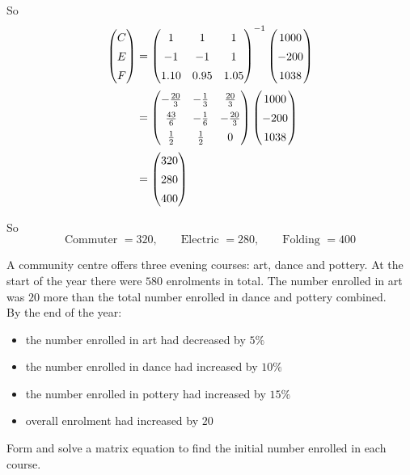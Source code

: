 \documentclass[leqno]{article}
\begin{document}
\begin{enumerate}[
  label=\textbf{\arabic*.},
  leftmargin=*,
  topsep=0pt,
  partopsep=0pt,
  parsep=0pt
]
\begin{djsSolution}
\begin{enumerate}[label=\textbf{(\alph*)}]
So
\begin{align*}
\begin{pmatrix}
C\\
E\\
F
\end{pmatrix}
&=
\begin{pmatrix}
1&1&1\\
-1&-1&1\\
1.10&0.95&1.05
\end{pmatrix}^{-1}
\begin{pmatrix}
1000\\
-200\\
1038
\end{pmatrix} \\
&=
\renewcommand{\arraystretch}{1.4}
\begin{pmatrix}
-\frac{20}{3}&-\frac{1}{3}&\frac{20}{3}\\
\frac{43}{6}&-\frac{1}{6}&-\frac{20}{3}\\
\frac12&\frac12&0
\end{pmatrix}
\begin{pmatrix}
1000\\
-200\\
1038
\end{pmatrix} \\
&=
\begin{pmatrix}
320\\
280\\
400
\end{pmatrix}
\end{align*}

So
\[
\text{Commuter }=320,\qquad \text{Electric }=280,\qquad \text{Folding }=400
\]
\end{enumerate}
\end{djsSolution}


\newpage

\questionitem

A community centre offers three evening courses: art, dance and pottery. At the start of the year there were $580$ enrolments in total. The number enrolled in art was $20$ more than the total number enrolled in dance and pottery combined. \\

By the end of the year:
\begin{itemize}
\item the number enrolled in art had decreased by $5\%$
\item the number enrolled in dance had increased by $10\%$
\item the number enrolled in pottery had increased by $15\%$
\item overall enrolment had increased by $20$
\end{itemize}
Form and solve a matrix equation to find the initial number enrolled in each course.  \\


\end{enumerate}
\end{document}
